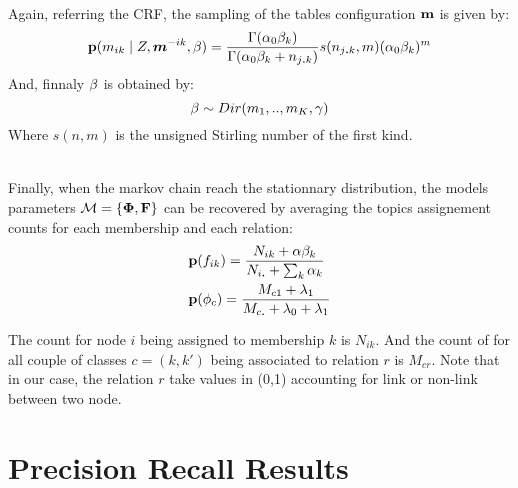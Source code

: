 ~\\
Again, referring the CRF, the sampling of the tables configuration $\mathbf{m}$ is given by: 
\begin{equation}
\mathbf{p}(m_{ik} \mid Z, \bm{m}^{-ik}, \mathbf{\beta} ) = \frac{\Gamma(\alpha_0 \beta_k)}{\Gamma(\alpha_0 \beta_k + n_{j\bm{.   }k})} s(n_{j\bm{.}k}, m) (\alpha_0 \beta_k)^m
\end{equation}
And, finnaly  $\mathbf{\beta}$ is obtained by:
\begin{equation}
\mathbf{\beta} \sim Dir(m_1,.., m_K, \gamma)  
\end{equation}
Where $s(n,m)$ is the unsigned Stirling number of the first kind.


~\\
Finally, when the markov chain reach the stationnary distribution, the models parameters $\mathcal{M} = \{\mathbf{\Phi}, \mathbf{F}\}$ can be recovered by averaging the topics assignement counts for each membership and each relation:
\begin{align}
&\mathbf{p}(f_{ik}) =\frac{ N_{ik} + \alpha\beta_k}{ N_{i\bm{.}} + \sum_k\alpha_k }\\
&\mathbf{p}(\phi_c ) = \frac{M_{c1} + \lambda_1}{M_{c\bm{.}} + \lambda_0 + \lambda_1}
\end{align}


The count for node $i$ being assigned to membership $k$ is $N_{ik}$. And the count of for all couple of classes $c=(k,k')$ being associated to relation $r$ is $M_{cr}$. Note that in our case, the relation $r$ take values in (0,1) accounting for link or non-link between two node.

\section{Precision Recall Results}
\label{sec:precision_recall}


